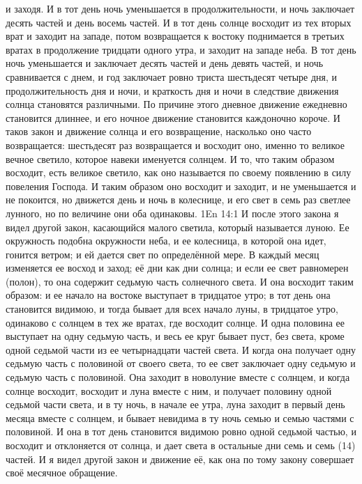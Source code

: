 и заходя.
И в тот день ночь уменьшается в продолжительности, и ночь заключает
десять частей и день восемь частей.
И в тот день солнце восходит из тех вторых врат и заходит на западе,
потом возвращается к востоку поднимается в третьих вратах в продолжение
тридцати одного утра, и заходит на западе неба.
В тот день ночь уменьшается и заключает десять частей и день девять
частей, и ночь сравнивается с днем, и год заключает ровно триста шестьдесят
четыре дня, и продолжительность дня и ночи, и краткость дня и ночи в следствие
движения солнца становятся различными.
По причине этого дневное движение ежедневно становится длиннее, и его
ночное движение становится каждоночно короче.
И таков закон и движение солнца и его возвращение, насколько оно часто
возвращается: шестьдесят раз возвращается и восходит оно, именно то великое
вечное светило, которое навеки именуется солнцем.
И то, что таким образом восходит, есть великое светило, как оно
называется по своему появлению в силу повеления Господа.
И таким образом оно восходит и заходит, и не уменьшается и не
покоится, но движется день и ночь в колеснице, и его свет в семь раз светлее
лунного, но по величине они оба одинаковы.
\vs 1En 14:1
И после этого закона я видел другой закон, касающийся малого
светила, который называется луною.
Ее окружность подобна окружности неба, и ее колесница, в которой она
идет, гонится ветром; и ей дается свет по определённой мере.
В каждый месяц изменяется ее восход и заход; её дни как дни солнца; и
если ее свет равномерен (полон), то она содержит седьмую часть солнечного
света.
И она восходит таким образом: и ее начало на востоке выступает в
тридцатое утро; в тот день она становится видимою, и тогда бывает для всех
начало луны, в тридцатое утро, одинаково с солнцем в тех же вратах, где
восходит солнце.
И одна половина ее выступает на одну седьмую часть, и весь ее круг
бывает пуст, без света, кроме одной седьмой части из ее четырнадцати частей
света.
И когда она получает одну седьмую часть с половиной от своего света, то
ее свет заключает одну седьмую и седьмую часть с половиной.
Она заходит в новолуние вместе с солнцем, и когда солнце восходит,
восходит и луна вместе с ним, и получает половину одной седьмой части света, и
в ту ночь, в начале ее утра, луна заходит в первый день месяца вместе с
солнцем, и бывает невидима в ту ночь семью и семью частями с половиной.
И она в тот день становится видимою ровно одной седьмой частью, и
восходит и отклоняется от солнца, и дает света в остальные дни семь и семь (14)
частей.
И я видел другой закон и движение её, как она по тому закону
совершает своё месячное обращение.
